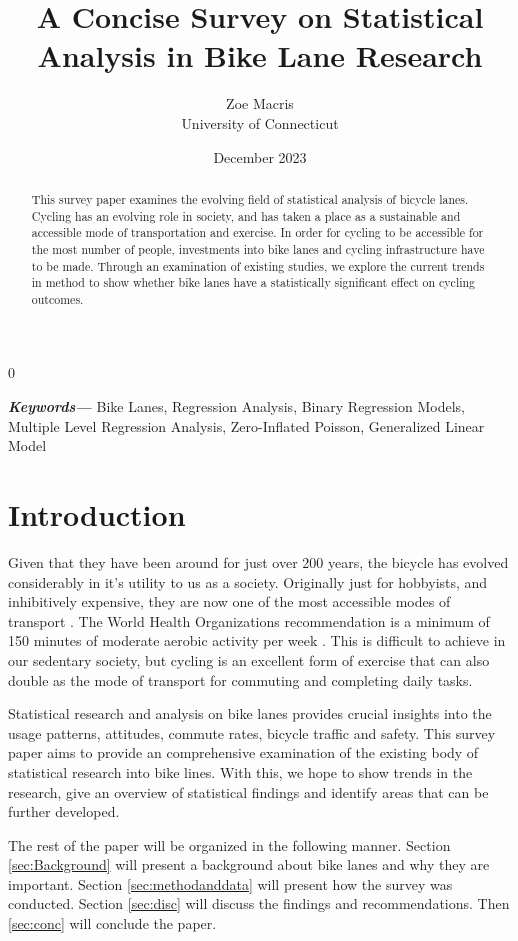 \documentclass[12pt, letterpaper]{article}
\newcommand{\blind}{0}
\providecommand{\keywords}[1]
{
  \small	
  \textbf{\textit{Keywords---}} #1
}
\begin{document}

\blind
{
  \title{\bf A Concise Survey on Statistical Analysis in Bike Lane Research}
  \author{Zoe Macris\\
  University of Connecticut}
\date{December 2023}
  \maketitle} 


\begin{abstract}
This survey paper examines the evolving field of statistical analysis of bicycle lanes. Cycling has an evolving role in society, and has taken a place as a sustainable and accessible mode of transportation and exercise. In order for cycling to be accessible for the most number of people, investments into bike lanes and cycling infrastructure have to be made. Through an examination of existing studies, we explore the current trends in method to show whether bike lanes have a statistically significant effect on cycling outcomes. 
\end{abstract}
\label{sec:abstract}

\keywords{Bike Lanes, Regression Analysis, Binary Regression Models, Multiple Level Regression Analysis, Zero-Inflated Poisson, Generalized Linear Model}


\section{Introduction}
\label{sec:intro}

Given that they have been around for just over 200 years, the bicycle has  evolved considerably in it's utility to us as a society. Originally just for hobbyists, and inhibitively expensive, they are now one of the most accessible modes of transport \cite{BIKE2023}. The World Health Organizations recommendation is a minimum of 150 minutes of moderate aerobic activity per week \citep{WHO2020}. This is difficult to achieve in our sedentary society, but cycling is an excellent form of exercise that can also double as the mode of transport for commuting and completing daily tasks. \par
Statistical research and analysis on bike lanes provides crucial insights into the usage patterns, attitudes, commute rates, bicycle traffic and safety. This survey paper aims to provide an comprehensive examination of the existing body of statistical research into bike lines. With this, we hope to show trends in the research, give an overview of statistical findings and identify areas that can be further developed. \par
The rest of the paper will be organized in the following manner. Section \ref{sec:Background} will present a background about bike lanes and why they are important. Section \ref{sec:methodanddata} will present how the survey was conducted. Section \ref{sec:disc} will discuss the findings and recommendations. Then \ref{sec:conc} will conclude the paper.
\end{document}
